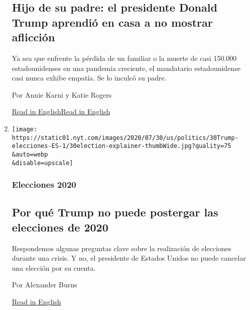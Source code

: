 \begin{enumerate}
  \hypertarget{hijo-de-su-padre-el-presidente-donald-trump-aprendiuxf3-en-casa-a-no-mostrar-aflicciuxf3n}{%
  \subsection{Hijo de su padre: el presidente Donald Trump aprendió en
  casa a no mostrar
  aflicción}\label{hijo-de-su-padre-el-presidente-donald-trump-aprendiuxf3-en-casa-a-no-mostrar-aflicciuxf3n}}

  Ya sea que enfrente la pérdida de un familiar o la muerte de casi
  150.000 estadounidenses en una pandemia creciente, el mandatario
  estadounidense casi nunca exhibe empatía. Se lo inculcó su padre.

  Por Annie Karni y Katie Rogers

  \href{https://www.nytimes.com/2020/07/28/us/politics/donald-fred-trump.html}{Read
  in
  English}\href{https://www.nytimes.com/2020/07/28/us/politics/donald-fred-trump.html}{Read
  in English}
\item
  \href{/es/2020/07/30/espanol/estados-unidos/trump-retrasar-elecciones.html}{}

  \texttt{[image: https://static01.nyt.com/images/2020/07/30/us/politics/30Trump-elecciones-ES-1/30election-explainer-thumbWide.jpg?quality=75\\\&auto=webp\\\&disable=upscale]}

  \hypertarget{elecciones-2020}{%
  \subsubsection{Elecciones 2020}\label{elecciones-2020}}

  \hypertarget{por-quuxe9-trump-no-puede-postergar-las-elecciones-de-2020}{%
  \subsection{Por qué Trump no puede postergar las elecciones de
  2020}\label{por-quuxe9-trump-no-puede-postergar-las-elecciones-de-2020}}

  Respondemos algunas preguntas clave sobre la realización de elecciones
  durante una crisis. Y no, el presidente de Estados Unidos no puede
  cancelar una elección por su cuenta.

  Por Alexander Burns

  \href{https://www.nytimes.com/2020/07/30/us/politics/trump-postpone-election.html}{Read
  in English}
\end{enumerate}

